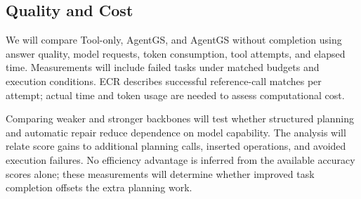 \subsection{Quality and Cost}
\label{sec:quality-cost}
We will compare Tool-only, AgentGS, and AgentGS without completion using answer quality, model requests, token consumption, tool attempts, and elapsed time. Measurements will include failed tasks under matched budgets and execution conditions. ECR describes successful reference-call matches per attempt; actual time and token usage are needed to assess computational cost.

Comparing weaker and stronger backbones will test whether structured planning and automatic repair reduce dependence on model capability. The analysis will relate score gains to additional planning calls, inserted operations, and avoided execution failures. No efficiency advantage is inferred from the available accuracy scores alone; these measurements will determine whether improved task completion offsets the extra planning work.

